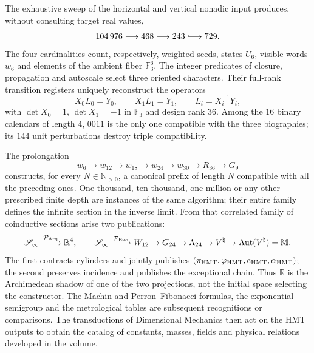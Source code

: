 \begin{theorem}
\label{thm:front-tesis-generativa-doble-proyeccion-2084}
The exhaustive sweep of the horizontal and vertical nonadic input produces,
without consulting target real values,
\[
 104\,976\longrightarrow468\longrightarrow243
 \lhook\joinrel\longrightarrow729.
\]
The four cardinalities count, respectively, weighted seeds, states
\(U_6\), visible words \(w_6\) and elements of the ambient fiber
\(\mathbb F_3^6\). The integer predicates of closure, propagation and
autoscale select three oriented characters. Their full-rank transition
registers uniquely reconstruct the operators
\[
 X_0L_0=Y_0,
 \qquad X_1L_1=Y_1,
 \qquad
 L_i=X_i^{-1}Y_i,
\]
with \(\det X_0=1\), \(\det X_1=-1\) in \(\mathbb F_3\) and design
rank \(36\). Among the \(16\) binary calendars of length \(4\),
\(0011\) is the only one compatible with the three biographies; its \(144\)
unit perturbations destroy triple compatibility.

The prolongation
\[
 w_6\longrightarrow w_{12}\longrightarrow w_{18}\longrightarrow w_{24}
 \longrightarrow w_{30}\longrightarrow R_{36}\longrightarrow G_9
\]
constructs, for every \(N\in\mathbb N_{>0}\), a canonical prefix of
length \(N\) compatible with all the preceding ones. One thousand, ten thousand, one million
or any other prescribed finite depth are instances of the same
algorithm; their entire family defines the infinite section in the inverse
limit. From that correlated family of coinductive sections arise
two publications:
\[
 \mathscr S_\infty\xrightarrow{\mathcal P_{\rm Arq}}\mathbb R^4,
 \qquad
 \mathscr S_\infty\xrightarrow{\mathcal P_{\rm Exc}}
 W_{12}\to G_{24}\to\Lambda_{24}\to V^\natural
 \to\operatorname{Aut}(V^\natural)=\mathbb M.
\]
The first contracts cylinders and jointly publishes
\((\pi_{\rm HMT},\varphi_{\rm HMT},e_{\rm HMT},\alpha_{\rm HMT})\); the
second preserves incidence and publishes the exceptional chain. Thus
\(\mathbb R\) is the Archimedean shadow of one of the two projections, not
the initial space selecting the constructor. The Machin and
Perron--Fibonacci formulas, the exponential semigroup and the metrological tables are
subsequent recognitions or comparisons. The transductions of Dimensional
Mechanics then act on the HMT outputs to obtain the catalog of
constants, masses, fields and physical relations developed in the volume.
\end{theorem}

